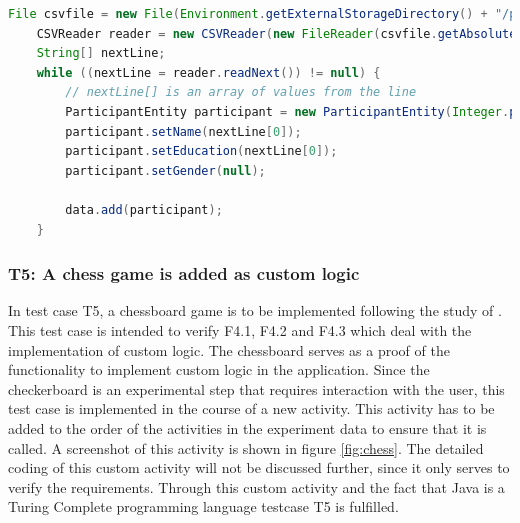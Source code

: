 \vspace{0.5cm}

\begin{lstlisting}[language=java,label=t3b,lineskip={0pt}, caption=T4: Loading of Data into the Artefact, basicstyle=\scriptsize, captionpos=b]
    File csvfile = new File(Environment.getExternalStorageDirectory() + "/participantData.csv");
    CSVReader reader = new CSVReader(new FileReader(csvfile.getAbsolutePath()));
    String[] nextLine;
    while ((nextLine = reader.readNext()) != null) {
        // nextLine[] is an array of values from the line
        ParticipantEntity participant = new ParticipantEntity(Integer.parseInt(nextLine[0]));
        participant.setName(nextLine[0]);
        participant.setEducation(nextLine[0]);
        participant.setGender(null);
    
        data.add(participant);
    }
\end{lstlisting}

\newpage

\subsubsection*{T5: A chess game is added as custom logic}

In test case T5, a chessboard game is to be implemented following the study of \cite{Krakowski.2022}. This test case is intended to verify F4.1, F4.2 and F4.3 which deal with the implementation of custom logic. The chessboard serves as a proof of the functionality to implement custom logic in the application. Since the checkerboard is an experimental step that requires interaction with the user, this test case is implemented in the course of a new activity. This activity has to be added to the order of the activities in the experiment data to ensure that it is called. A screenshot of this activity is shown in figure \ref{fig:chess}. The detailed coding of this custom activity will not be discussed further, since it only serves to verify the requirements. Through this custom activity and the fact that Java is a Turing Complete programming language testcase T5 is fulfilled.




